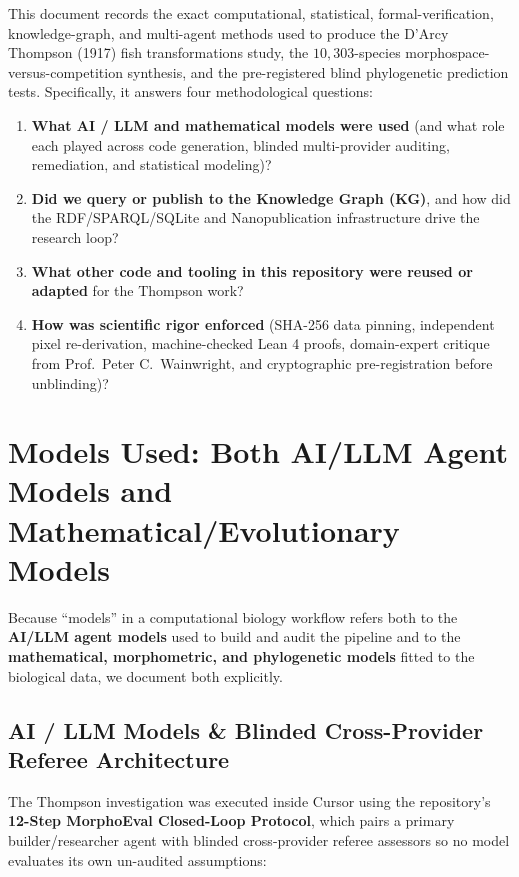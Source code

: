 \documentclass[10.5pt,a4paper]{article}
\begin{document}
This document records the exact computational, statistical, formal-verification, knowledge-graph, and multi-agent methods used to produce the D'Arcy Thompson (1917) fish transformations study, the $10{,}303$-species morphospace-versus-competition synthesis, and the pre-registered blind phylogenetic prediction tests. Specifically, it answers four methodological questions:
\begin{enumerate}
  \setlength{\itemsep}{3pt}
  \item \textbf{What AI / LLM and mathematical models were used} (and what role each played across code generation, blinded multi-provider auditing, remediation, and statistical modeling)?
  \item \textbf{Did we query or publish to the Knowledge Graph (KG)}, and how did the RDF/SPARQL/SQLite and Nanopublication infrastructure drive the research loop?
  \item \textbf{What other code and tooling in this repository were reused or adapted} for the Thompson work?
  \item \textbf{How was scientific rigor enforced} (SHA-256 data pinning, independent pixel re-derivation, machine-checked Lean 4 proofs, domain-expert critique from Prof.\ Peter C.\ Wainwright, and cryptographic pre-registration before unblinding)?
\end{enumerate}

\section{Models Used: Both AI/LLM Agent Models and Mathematical/Evolutionary Models}

Because ``models'' in a computational biology workflow refers both to the \textbf{AI/LLM agent models} used to build and audit the pipeline and to the \textbf{mathematical, morphometric, and phylogenetic models} fitted to the biological data, we document both explicitly.

\subsection{AI / LLM Models \& Blinded Cross-Provider Referee Architecture}

The Thompson investigation was executed inside Cursor using the repository's \textbf{12-Step MorphoEval Closed-Loop Protocol}, which pairs a primary builder/researcher agent with blinded cross-provider referee assessors so no model evaluates its own un-audited assumptions:
\end{document}
